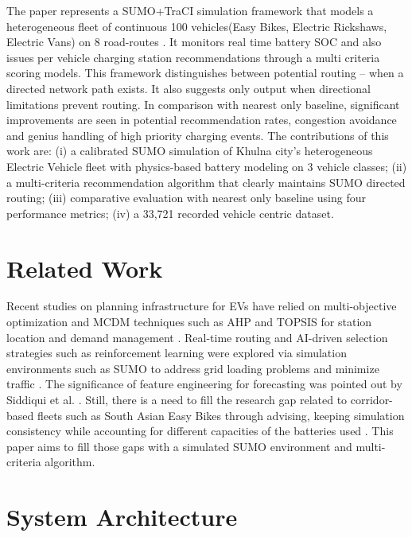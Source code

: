 \documentclass[conference]{IEEEtran}
\begin{document}
The paper represents a SUMO+TraCI simulation framework that models a
heterogeneous fleet of continuous 100 vehicles(Easy Bikes, Electric
Rickshaws, Electric Vans) on 8 road-routes \cite{b10, b11}. It monitors real time
battery SOC and also issues per vehicle charging station recommendations
through a multi criteria scoring models. This framework distinguishes
between potential routing -- when a directed network path exists. It
also suggests only output when directional limitations prevent routing.
In comparison with nearest only baseline, significant improvements are
seen in potential recommendation rates, congestion avoidance and genius
handling of high priority charging events. The contributions of this
work are: (i) a calibrated SUMO simulation of Khulna city's
heterogeneous Electric Vehicle fleet with physics-based battery modeling
on 3 vehicle classes; (ii) a multi-criteria recommendation algorithm
that clearly maintains SUMO directed routing; (iii) comparative
evaluation with nearest only baseline using four performance metrics;
(iv) a 33,721 recorded vehicle centric dataset.

\vspace{-3mm}
\section{Related Work}

Recent studies on planning infrastructure for EVs have relied on multi-objective optimization and MCDM techniques such as AHP and TOPSIS for station location and demand management \cite{b1, b2, b5, b6}. Real-time routing and AI-driven selection strategies such as reinforcement learning were explored via simulation environments such as SUMO to address grid loading problems and minimize traffic \cite{b7, b10, b12, b17}. The significance of feature engineering for forecasting was pointed out by Siddiqui et al. \cite{b8}. Still, there is a need to fill the research gap related to corridor-based fleets such as South Asian Easy Bikes through advising, keeping simulation consistency while accounting for different capacities of the batteries used \cite{b15}. This paper aims to fill those gaps with a simulated SUMO environment and multi-criteria algorithm.


\vspace{-3mm}
\section{System Architecture}
\end{document}
